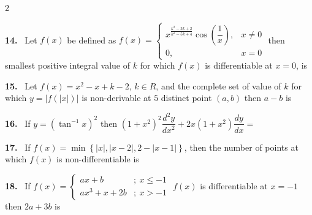 \documentclass[10pt]{extarticle}
\newcommand{\qn}[1]{\par\smallskip\noindent\textbf{#1.}~}
\begin{document}
\begin{multicols}{2}
\qn{14} Let $f(x)$ be defined as $f(x)=\begin{cases}x^{\frac{k^2-3k+2}{k^2-5k+4}}\cos\left(\dfrac1x\right), & x\ne0\\ 0, & x=0\end{cases}$ then smallest positive integral value of $k$ for which $f(x)$ is differentiable at $x=0$, is \underline{\hspace{2cm}}
\qn{15} Let $f(x)=x^2-x+k-2$, $k\in R$, and the complete set of value of $k$ for which $y=\left|f\left(|x|\right)\right|$ is non-derivable at $5$ distinct point $(a,b)$ then $a-b$ is \underline{\hspace{2cm}}
\qn{16} If $y=\left(\tan^{-1}x\right)^2$ then $\left(1+x^2\right)^2\dfrac{d^2y}{dx^2}+2x\left(1+x^2\right)\dfrac{dy}{dx}=$ \underline{\hspace{2cm}}
\qn{17} If $f(x)=\min\left\{|x|,|x-2|,2-|x-1|\right\}$, then the number of points at which $f(x)$ is non-differentiable is \underline{\hspace{2cm}}
\qn{18} If $f(x)=\begin{cases}ax+b & ;\ x\le-1\\ ax^3+x+2b & ;\ x>-1\end{cases}$ $f(x)$ is differentiable at $x=-1$ then $2a+3b$ is \underline{\hspace{2cm}}
\end{multicols}
\end{document}
